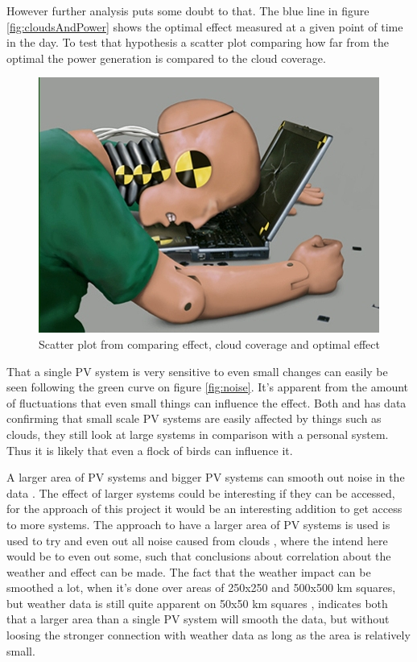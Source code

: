 However further analysis puts some doubt to that.  The blue line in
figure \ref{fig:cloudsAndPower} shows the optimal effect measured at a
given point of time in the day.  To test that hypothesis a scatter
plot comparing how far from the optimal the power generation is
compared to the cloud coverage.

\begin{figure}[h]
  \centering
  \includegraphics{dummy.jpg}
  \caption{Scatter plot from comparing effect, cloud coverage and
    optimal effect}
  \label{fig:fractiles}
\end{figure}


That a single PV system is very sensitive to even small changes can
easily be seen following the green curve on figure \ref{fig:noise}.
It's apparent from the amount of fluctuations that even small things
can influence the effect.  Both \citep{cloudTrack} and
\citep{southafrica} has data confirming that small scale PV systems
are easily affected by things such as clouds, they still look at large
systems in comparison with a personal system.  Thus it is likely that
even a flock of birds can influence it.

A larger area of PV systems and bigger PV systems can smooth out noise
in the data \citep{southafrica,cloudTrack}.  The effect of larger
systems could be interesting if they can be accessed, for the approach
of this project it would be an interesting addition to get access to
more systems.  The approach to have a larger area of PV systems is
used is used to try and even out all noise caused from clouds
\citep{southafrica}, where the intend here would be to even out some,
such that conclusions about correlation about the weather and effect
can be made.  The fact that the weather impact can be smoothed a lot,
when it's done over areas of 250x250 and 500x500 km squares, but
weather data is still quite apparent on 50x50 km squares
\citep{southafrica}, indicates both that a larger area than a single
PV system will smooth the data, but without loosing the stronger
connection with weather data as long as the area is relatively small.

